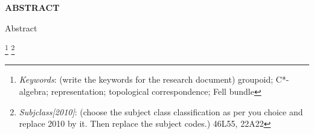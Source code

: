 
\begin{center}\Large{\textbf{ABSTRACT}}\end{center}
Abstract




\let\thefootnote\relax\footnote{\emph{Keywords}: (write the keywords
  for the research document) groupoid; C*-algebra; representation;
  topological correspondence; Fell bundle}
\let\thefootnote\relax\footnote{\emph{Subjclass[2010]}: (choose the
  subject class classification as per you choice and replace 2010 by
  it. Then replace the subject codes.) 46L55, 22A22}